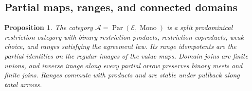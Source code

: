 \documentclass[11pt]{article}
\newtheorem{proposition}[theorem]{Proposition}
\begin{document}
\subsection{Partial maps, ranges, and connected domains}

\begin{proposition}\label{prop:fork-structure}
The category $\mathcal A=\operatorname{Par}(\mathcal E,
\operatorname{Mono})$ is a split prodominical restriction category
with binary restriction products, restriction coproducts, weak
choice, and ranges satisfying the agreement law. Its range idempotents
are the partial identities on the regular images of the value maps.
Domain joins are finite
unions, and inverse image along every partial arrow preserves
binary meets and finite joins. Ranges commute with products and
are stable under pullback along total arrows.
\end{proposition}
\end{document}
